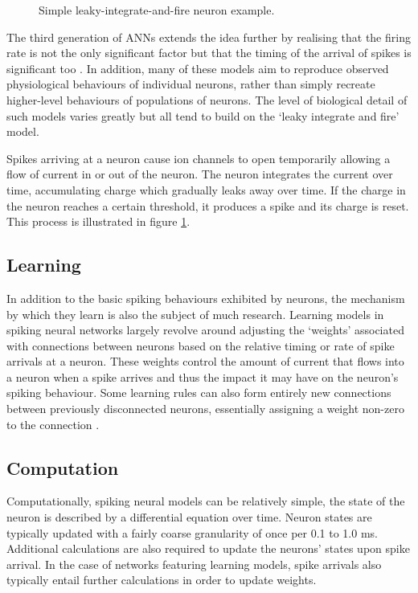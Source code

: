 			\begin{figure}
				\center
				
				\caption{Simple leaky-integrate-and-fire neuron example.}
				\label{fig:snn-example}
			\end{figure}
			
			The third generation of ANNs extends the idea further by realising that
			the firing rate is not the only significant factor but that the timing of
			the arrival of spikes is significant too \cite{maass01}. In addition, many
			of these models aim to reproduce observed physiological behaviours of
			individual neurons, rather than simply recreate higher-level behaviours of
			populations of neurons. The level of biological detail of such models
			varies greatly but all tend to build on the `leaky integrate and fire'
			model.
			
			Spikes arriving at a neuron cause ion channels to open temporarily
			allowing a flow of current in or out of the neuron. The neuron integrates
			the current over time, accumulating charge which gradually leaks away over
			time. If the charge in the neuron reaches a certain threshold, it produces
			a spike and its charge is reset. This process is illustrated in figure
			\ref{fig:snn-example}.
		
		\subsection{Learning}
			
			In addition to the basic spiking behaviours exhibited by neurons, the
			mechanism by which they learn is also the subject of much research.
			Learning models in spiking neural networks largely revolve around
			adjusting the `weights' associated with connections between neurons based
			on the relative timing \cite{pfister06} or rate \cite{bienenstock82} of
			spike arrivals at a neuron. These weights control the amount of current
			that flows into a neuron when a spike arrives and thus the impact it may
			have on the neuron's spiking behaviour. Some learning rules can also form
			entirely new connections between previously disconnected neurons,
			essentially assigning a weight non-zero to the connection
			\cite{bamford10}.
		
		\subsection{Computation}
			
			Computationally, spiking neural models can be relatively simple, the state
			of the neuron is described by a differential equation over time. Neuron
			states are typically updated with a fairly coarse granularity of once per
			0.1 to 1.0 ms. Additional calculations are also required to update the
			neurons' states upon spike arrival. In the case of networks featuring
			learning models, spike arrivals also typically entail further calculations
			in order to update weights.
			
